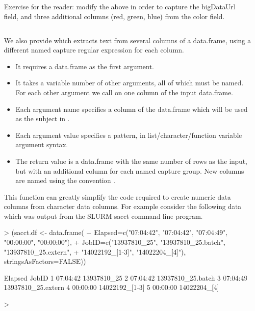 Exercise for the reader: modify the above in order to capture the
bigDataUrl field, and three additional columns (red, green, blue) from
the color field.

\subsection{\sectiondf}

\label{sec:df_match_variable}

We also provide  which extracts text
from several columns of a data.frame, using a different named capture
regular expression for each column.

\begin{itemize}
\item It requires a data.frame as the first argument.
\item It takes a variable number of other arguments, all of which must be
  named. For each other argument we call  on one
  column of the input data.frame.
\item Each argument name specifies a column of the data.frame which will
  be used as the subject in .
\item Each argument value specifies a pattern, in
  list/character/function variable argument syntax.
\item The return value is a data.frame with the same number of rows as the
  input, but with an additional column for each named capture
  group. New columns are named using the convention
  .
\end{itemize}
This function can greatly simplify the code required to create numeric
data columns from character data columns. For example consider the
following data which was output from the SLURM sacct command line program.

\begin{Schunk}
\begin{Sinput}
> (sacct.df <- data.frame(
+   Elapsed=c("07:04:42", "07:04:42", "07:04:49", "00:00:00", "00:00:00"),
+   JobID=c("13937810_25", "13937810_25.batch", "13937810_25.extern",
+     "14022192_[1-3]", "14022204_[4]"), stringsAsFactors=FALSE))
\end{Sinput}
\begin{Soutput}
   Elapsed              JobID
1 07:04:42        13937810_25
2 07:04:42  13937810_25.batch
3 07:04:49 13937810_25.extern
4 00:00:00     14022192_[1-3]
5 00:00:00       14022204_[4]
\end{Soutput}
\begin{Sinput}
> 
\end{Sinput}
\end{Schunk}

